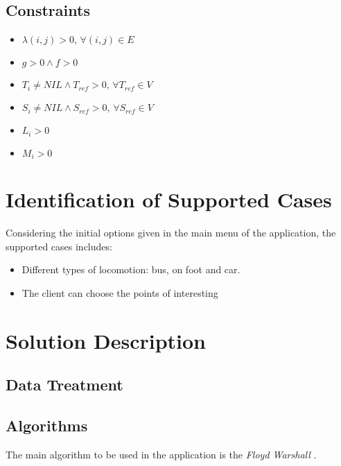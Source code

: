 \documentclass{article}
\begin{document}
\subsection*{Constraints}
\begin{itemize}
    \item $\lambda(i,j) > 0 \text{, } \forall (i,j) \in E$   
    \item $ g > 0 \wedge f > 0$
    \item $T_{i} \neq NIL \wedge T_{ref} > 0 \text{, } \forall T_{ref} \in V$
    \item $S_{i} \neq NIL \wedge S_{ref} > 0 \text{, } \forall S_{ref} \in V$
    \item $L_{i} > 0$
    \item $M_i > 0$
\end{itemize}


\section*{Identification of Supported Cases}
    Considering the initial options given in the main menu of the application, the supported cases includes: 
    \begin{itemize}
        \item Different types of locomotion: bus, on foot and car.
        \item The client can choose the points of interesting 
    
    \end{itemize}
\section*{Solution Description}
\subsection*{Data Treatment}

\subsection*{Algorithms}
    The main algorithm to be used in the application is the \textit{Floyd Warshall} \cite{IntroductionToAlgorithms} \cite{FloydWarshal}. \par
    
\end{document}
